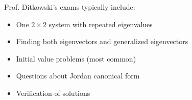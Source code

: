 \documentclass[12pt]{article}
\begin{document}
\begin{examtip}
Prof. Ditkowski's exams typically include:
\begin{itemize}
\item One $2\times2$ system with repeated eigenvalues
\item Finding both eigenvectors and generalized eigenvectors
\item Initial value problems (most common)
\item Questions about Jordan canonical form
\item Verification of solutions
\end{itemize}
\end{examtip}
\end{document}
